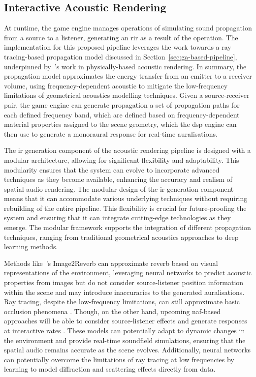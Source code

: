 \subsection{Interactive Acoustic Rendering}
At runtime, the game engine manages operations of simulating sound propagation from a source to a listener, generating an \acrfull{rir} as a result of the operation. The implementation for this proposed pipeline leverages the work towards a ray tracing-based propagation model discussed in Section~\ref{sec:ga-based-pipeline}, underpinned by~\cite{schroder2011physically}'s work in physically-based acoustic rendering. In summary, the propagation model approximates the energy transfer from an emitter to a receiver volume, using frequency-dependent acoustic to mitigate the low-frequency limitations of geometrical acoustics modelling techniques. Given a source-receiver pair, the game engine can generate propagation a set of propagation paths for each defined frequency band, which are defined based on frequency-dependent material properties assigned to the scene geometry, which the \acrshort{dsp} engine can then use to generate a monoraural response for real-time auralisations.\par
The \acrshort{ir} generation component of the acoustic rendering pipeline is designed with a modular architecture, allowing for significant flexibility and adaptability. This modularity ensures that the system can evolve to incorporate advanced techniques as they become available, enhancing the accuracy and realism of spatial audio rendering. The modular design of the \acrshort{ir} generation component means that it can accommodate various underlying techniques without requiring rebuilding of the entire pipeline. This flexibility is crucial for future-proofing the system and ensuring that it can integrate cutting-edge technologies as they emerge. The modular framework supports the integration of different propagation techniques, ranging from traditional geometrical acoustics approaches to deep learning methods.\par
Methods like~\cite{Singh_2021_ICCV}'s Image2Reverb can approximate reverb based on visual representations of the environment, leveraging neural networks to predict acoustic properties from images but do not consider source-listener position information within the scene and may introduce inaccuracies to the generated auralisations. Ray tracing, despite the low-frequency limitations, can still approximate basic occlusion phenomena \citep{savioja2015overview}. Though, on the other hand, upcoming \acrshort{naf}-based approaches will be able to consider source-listener effects and generate responses at interactive rates \citep{luo2022learning}. These models can potentially adapt to dynamic changes in the environment and provide real-time soundfield simulations, ensuring that the spatial audio remains accurate as the scene evolves. Additionally, neural networks can potentially overcome the limitations of ray tracing at low frequencies by learning to model diffraction and scattering effects directly from data.\par

